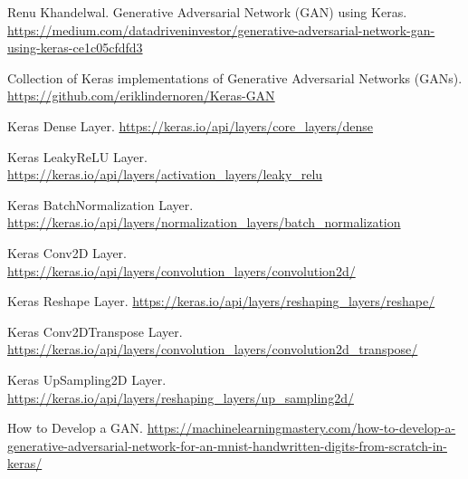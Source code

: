 \begin{thebibliography}{9}
 Renu Khandelwal. Generative Adversarial Network (GAN) using Keras.
\href{https://medium.com/datadriveninvestor/generative-adversarial-network-gan-using-keras-ce1c05cfdfd3}{https://medium.com/datadriveninvestor/generative-adversarial-network-gan-using-keras-ce1c05cfdfd3}

 Collection of Keras implementations of Generative Adversarial Networks (GANs).
\href{https://github.com/eriklindernoren/Keras-GAN}{https://github.com/eriklindernoren/Keras-GAN}

 Keras Dense Layer.
\href{https://keras.io/api/layers/core\_layers/dense}{https://keras.io/api/layers/core\_layers/dense}

 Keras LeakyReLU Layer.
\href{https://keras.io/api/layers/activation\_layers/leaky\_relu}{https://keras.io/api/layers/activation\_layers/leaky\_relu}

 Keras BatchNormalization Layer.
\href{https://keras.io/api/layers/normalization\_layers/batch\_normalization}{https://keras.io/api/layers/normalization\_layers/batch\_normalization}

 Keras Conv2D Layer.
\href{https://keras.io/api/layers/convolution\_layers/convolution2d/}{https://keras.io/api/layers/convolution\_layers/convolution2d/}

 Keras Reshape Layer.
\href{https://keras.io/api/layers/reshaping\_layers/reshape/}{https://keras.io/api/layers/reshaping\_layers/reshape/}

 Keras Conv2DTranspose Layer.
\href{https://keras.io/api/layers/convolution\_layers/convolution2d\_transpose/}{https://keras.io/api/layers/convolution\_layers/convolution2d\_transpose/}

 Keras UpSampling2D Layer.
\href{https://keras.io/api/layers/reshaping\_layers/up\_sampling2d/}{https://keras.io/api/layers/reshaping\_layers/up\_sampling2d/}


 How to Develop a GAN. 
\href{https://machinelearningmastery.com/how-to-develop-a-generative-adversarial-network-for-an-mnist-handwritten-digits-from-scratch-in-keras/}{https://machinelearningmastery.com/how-to-develop-a-generative-adversarial-network-for-an-mnist-handwritten-digits-from-scratch-in-keras/}

\end{thebibliography}